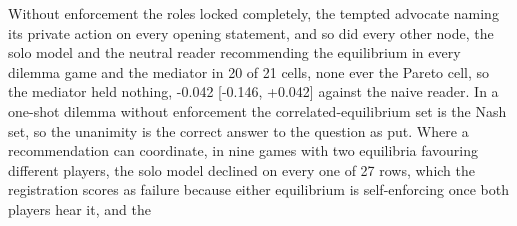 Without enforcement the roles locked completely, the tempted advocate
naming its private action on every opening statement, and so did every
other node, the solo model and the neutral reader recommending the
equilibrium in every dilemma game and the mediator in 20 of 21 cells,
none ever the Pareto cell, so the mediator held nothing, -0.042
[-0.146, +0.042] against the naive reader. In a one-shot dilemma without
enforcement the correlated-equilibrium set is the Nash set, so the
unanimity is the correct answer to the question as put.
Where a recommendation can coordinate, in nine games with two equilibria
favouring different players, the solo model declined on every one of 27
rows, which the registration scores as failure because either
equilibrium is self-enforcing once both players hear it, and the
